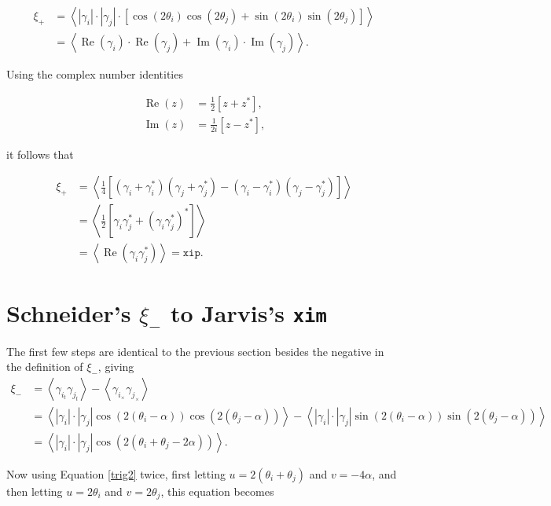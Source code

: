 \documentclass[%
 reprint,
 amsmath,amssymb,
 aps,nofootinbib
]{revtex4-1}
\begin{document}
\begin{align*}
\xi_+&=\left<|\gamma_i|\cdot|\gamma_j|\cdot\left[\cos\left(2\theta_i\right)\cos\left(2\theta_j\right)+\sin\left(2\theta_i\right)\sin\left(2\theta_j\right)\right]\right>\\
&=\left<\operatorname{Re}(\gamma_i)\cdot\operatorname{Re}(\gamma_j)+\operatorname{Im}(\gamma_i)\cdot\operatorname{Im}(\gamma_j)\right>.
\end{align*}

Using the complex number identities

\begin{align}
\operatorname{Re}(z)&=\frac{1}{2}\left[z+z^*\right],\label{complex1}\\
\operatorname{Im}(z)&=\frac{1}{2i}\left[z-z^*\right]\label{complex2},
\end{align}

it follows that

\begin{align*}
\xi_+&=\left<\frac{1}{4}\left[(\gamma_i+\gamma_i^*)(\gamma_j+\gamma_j^*)-(\gamma_i-\gamma_i^*)(\gamma_j-\gamma_j^*)\right]\right>\\
&=\left<\frac{1}{2}\left[\gamma_i\gamma_j^*+(\gamma_i\gamma_j^*)^*\right]\right>\\
&=\left<\operatorname{Re}(\gamma_i\gamma_j^*)\right>=\texttt{xip}.
\end{align*}

\section*{Schneider's $\xi_-$ to Jarvis's \texttt{xim}}

The first few steps are identical to the previous section besides the negative in the definition of $\xi_-$, giving
\begin{align*}
\xi_-&=\left<\gamma_{i_t}\gamma_{j_t}\right>-\left<\gamma_{i_\times}\gamma_{j_\times}\right>\\
&=\left<|\gamma_i|\cdot|\gamma_j|\cos\left(2(\theta_i-\alpha)\right)\cos\left(2(\theta_j-\alpha)\right)\right>-\left<|\gamma_i|\cdot|\gamma_j|\sin\left(2(\theta_i-\alpha)\right)\sin\left(2(\theta_j-\alpha)\right)\right>\\
&=\left<|\gamma_i|\cdot|\gamma_j|\cos\left(2(\theta_i+\theta_j-2\alpha)\right)\right>.
\end{align*}

Now using Equation \eqref{trig2} twice, first letting $u=2(\theta_i+\theta_j)$ and $v=-4\alpha$, and then letting $u=2\theta_i$ and $v=2\theta_j$, this equation becomes
\end{document}
